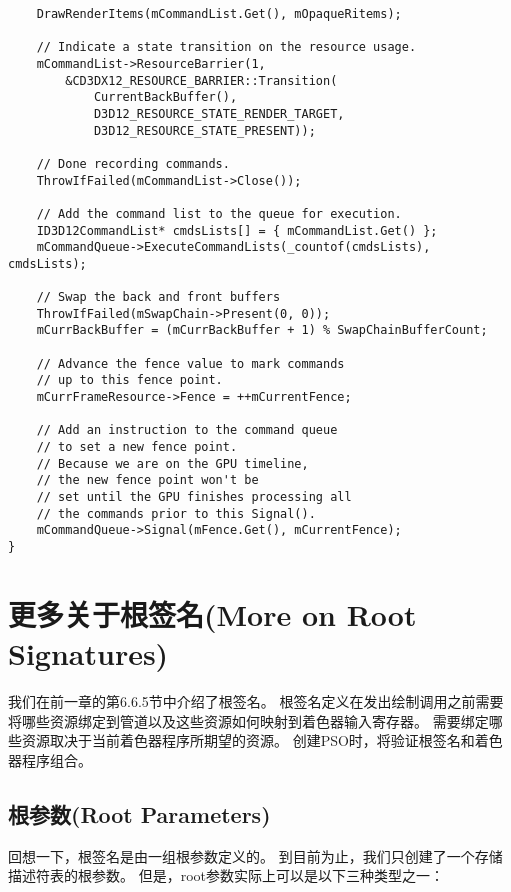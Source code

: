 \begin{lstlisting}
    DrawRenderItems(mCommandList.Get(), mOpaqueRitems);

    // Indicate a state transition on the resource usage.
    mCommandList->ResourceBarrier(1, 
        &CD3DX12_RESOURCE_BARRIER::Transition(
            CurrentBackBuffer(),
            D3D12_RESOURCE_STATE_RENDER_TARGET, 
            D3D12_RESOURCE_STATE_PRESENT));

    // Done recording commands.
    ThrowIfFailed(mCommandList->Close());

    // Add the command list to the queue for execution.
    ID3D12CommandList* cmdsLists[] = { mCommandList.Get() };
    mCommandQueue->ExecuteCommandLists(_countof(cmdsLists), cmdsLists);

    // Swap the back and front buffers
    ThrowIfFailed(mSwapChain->Present(0, 0));
    mCurrBackBuffer = (mCurrBackBuffer + 1) % SwapChainBufferCount;

    // Advance the fence value to mark commands 
    // up to this fence point.
    mCurrFrameResource->Fence = ++mCurrentFence;
    
    // Add an instruction to the command queue 
    // to set a new fence point. 
    // Because we are on the GPU timeline, 
    // the new fence point won't be 
    // set until the GPU finishes processing all
    // the commands prior to this Signal().
    mCommandQueue->Signal(mFence.Get(), mCurrentFence);
}
\end{lstlisting}

\section{更多关于根签名(More on Root Signatures)}
\begin{flushleft}
我们在前一章的第6.6.5节中介绍了根签名。 根签名定义在发出绘制调用之前需要将哪些资源绑定到管道以及这些资源如何映射到着色器输入寄存器。 需要绑定哪些资源取决于当前着色器程序所期望的资源。 创建PSO时，将验证根签名和着色器程序组合。
\end{flushleft}

\subsection{根参数(Root Parameters)}
\begin{flushleft}
回想一下，根签名是由一组根参数定义的。 到目前为止，我们只创建了一个存储描述符表的根参数。 但是，root参数实际上可以是以下三种类型之一：\\
\end{flushleft}

